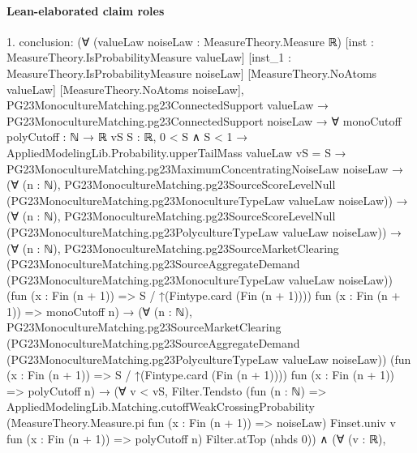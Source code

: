 \documentclass[10pt]{article}
\begin{document}
\paragraph{Lean-elaborated claim roles}\begin{ReviewVerbatim}
1. conclusion: (∀ (valueLaw noiseLaw : MeasureTheory.Measure ℝ) [inst : MeasureTheory.IsProbabilityMeasure valueLaw]
    [inst_1 : MeasureTheory.IsProbabilityMeasure noiseLaw] [MeasureTheory.NoAtoms valueLaw]
    [MeasureTheory.NoAtoms noiseLaw],
    PG23MonocultureMatching.pg23ConnectedSupport valueLaw →
      PG23MonocultureMatching.pg23ConnectedSupport noiseLaw →
        ∀ {monoCutoff polyCutoff : ℕ → ℝ} {vS S : ℝ},
          0 < S ∧ S < 1 →
            AppliedModelingLib.Probability.upperTailMass valueLaw vS = S →
              PG23MonocultureMatching.pg23MaximumConcentratingNoiseLaw noiseLaw →
                (∀ (n : ℕ),
                    PG23MonocultureMatching.pg23SourceScoreLevelNull
                      (PG23MonocultureMatching.pg23MonocultureTypeLaw valueLaw noiseLaw)) →
                  (∀ (n : ℕ),
                      PG23MonocultureMatching.pg23SourceScoreLevelNull
                        (PG23MonocultureMatching.pg23PolycultureTypeLaw valueLaw noiseLaw)) →
                    (∀ (n : ℕ),
                        PG23MonocultureMatching.pg23SourceMarketClearing
                          (PG23MonocultureMatching.pg23SourceAggregateDemand
                            (PG23MonocultureMatching.pg23MonocultureTypeLaw valueLaw noiseLaw))
                          (fun (x : Fin (n + 1)) => S / ↑(Fintype.card (Fin (n + 1)))) fun (x : Fin (n + 1)) =>
                          monoCutoff n) →
                      (∀ (n : ℕ),
                          PG23MonocultureMatching.pg23SourceMarketClearing
                            (PG23MonocultureMatching.pg23SourceAggregateDemand
                              (PG23MonocultureMatching.pg23PolycultureTypeLaw valueLaw noiseLaw))
                            (fun (x : Fin (n + 1)) => S / ↑(Fintype.card (Fin (n + 1)))) fun (x : Fin (n + 1)) =>
                            polyCutoff n) →
                        (∀ v < vS,
                            Filter.Tendsto
                              (fun (n : ℕ) =>
                                AppliedModelingLib.Matching.cutoffWeakCrossingProbability
                                  (MeasureTheory.Measure.pi fun (x : Fin (n + 1)) => noiseLaw) Finset.univ v
                                  fun (x : Fin (n + 1)) => polyCutoff n)
                              Filter.atTop (nhds 0)) ∧
                          (∀ (v : ℝ),

\end{ReviewVerbatim}
\end{document}
